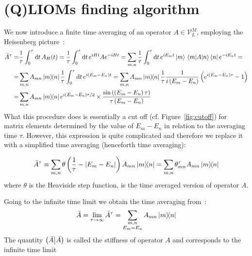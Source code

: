 \section{(Q)LIOMs finding algorithm\label{sec:algorithm}}
We now introduce a finite time averaging of an operator \(A\in \mathcal{V}_L^M\), employing the Heisenberg picture~\autocite{Mierzejewski2015Approx}:
\begin{align}
  \bar{A}^{\tau} = & \frac{1}{\tau} \int_0^{\tau} \mathrm{d}t\, A_{H}(t) = \frac{1}{\tau} \int_0^{\tau} \mathrm{d}t\, e^{i H t}A e^{-i H t}
  =\sum_{m,n} \frac{1}{\tau} \int_0^{\tau} \mathrm{d}t\, e^{i E_m t}\ket{m} \matrixel{m}{A}{n}\bra{n}  e^{-i E_n t} = \nonumber{}           \\
  =                & \sum_{m,n} A_{mn}\ketbra{m}{n} \frac{1}{\tau} \int_0^{\tau} \mathrm{d}t \, e^{i(E_m-E_n)t} =
  \sum_{m,n} A_{mn}\ketbra{m}{n} \frac{1}{\tau} \frac{1}{i\left(E_m-E_n\right)}\left(e^{i\left(E_m-E_n\right)\tau}-1\right) \nonumber       \\
  =                & \sum_{m,n} A_{mn}\ketbra{m}{n}
  e^{i\left(E_m-E_n\right)\tau/2}\times \frac{\sin{\left(\left(E_m-E_n\right)\tau\right)}}{\tau\left(E_m-E_n\right)}
  \label{eq:time_avg}
\end{align}
What this procedure does is essentially a cut off (cf. Figure~\ref{fig:cutoff}) for matrix elements determined by the value of \(E_m-E_n\) in relation
to the averaging time \(\tau{}\). However, this expression is quite complicated and therefore we replace it with a simplified time
averaging (henceforth time averaging):
\begin{definition}
  \begin{equation}
    \bar{A}^{\tau} \equiv \sum_{m,n} \theta\left(\frac{1}{\tau} - \abs{E_m-E_n}\right) A_{mn} \ketbra{m}{n}
    = \sum_{m,n} \theta_{mn}^{\tau} A_{mn} \ketbra{m}{n}
    \label{def:simple time avg}
  \end{equation}
  where \(\theta{}\) is the Heaviside step function, is the time averaged version of operator \(A\).
\end{definition}
Going to the infinite time limit we obtain the time averaging
from~\textcite{Mierzejewski2015a}:
\begin{equation}
  \bar{A} = \lim_{\tau \to \infty} \bar{A}^{\tau} = \sum_{ \substack{m,n\\E_m=E_n} } A_{mn} \ketbra{m}{n}
  \label{eq:inf time avg}
\end{equation}
The quantity \(\left(\bar{A} \middle| \bar{A}\right)\) is called the stiffness of operator \(A\) and corresponds to the infinite time limit
